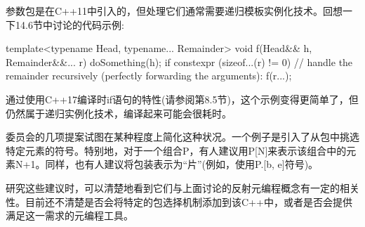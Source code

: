 参数包是在C++11中引入的，但处理它们通常需要递归模板实例化技术。回想一下14.6节中讨论的代码示例:

\begin{cpp}
template<typename Head, typename... Remainder>
void f(Head&& h, Remainder&&... r) {
	doSomething(h);
	if constexpr (sizeof...(r) != 0) {
		// handle the remainder recursively (perfectly forwarding the arguments):
		f(r...);
	}
}
\end{cpp}

通过使用C++17编译时if语句的特性(请参阅第8.5节)，这个示例变得更简单了，但仍然属于递归实例化技术，编译起来可能会很耗时。

委员会的几项提案试图在某种程度上简化这种状况。一个例子是引入了从包中挑选特定元素的符号。特别地，对于一个组合P，有人建议用P[N]来表示该组合中的元素N+1。同样，也有人建议将包装表示为“片”(例如，使用P.[b, e]符号)。

研究这些建议时，可以清楚地看到它们与上面讨论的反射元编程概念有一定的相关性。目前还不清楚是否会将特定的包选择机制添加到该C++中，或者是否会提供满足这一需求的元编程工具。




















































